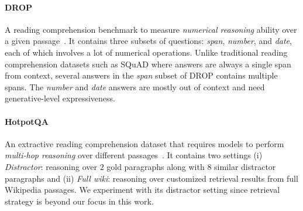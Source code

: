 \paragraph{DROP} A reading comprehension benchmark to measure \textit{numerical reasoning} ability over a given passage~\cite{dua-etal-2019-drop}.
It contains three subsets of questions: \textit{span}, \textit{number}, and \textit{date}, each of which involves a lot of numerical operations. Unlike traditional reading comprehension datasets such as SQuAD \cite{rajpurkar-etal-2016-squad} where answers are always a single span from context, several answers in the \textit{span} subset of DROP contains multiple spans.
The \textit{number} and \textit{date} answers are mostly out of context and need generative-level expressiveness.

\paragraph{HotpotQA} An extractive reading comprehension dataset that requires models to perform \textit{multi-hop reasoning} over different passages~\cite{yang-etal-2018-hotpotqa}.
It contains two settings (i) \textit{Distractor}: reasoning over $2$ gold paragraphs along with $8$ similar distractor paragraphs and (ii) \textit{Full wiki}: reasoning over customized retrieval results from full Wikipedia passages.
We experiment with its distractor setting since retrieval strategy is beyond our focus in this work.

\begin{table}[t]
  \centering
  \small
  \caption{The statistics of our experimental datasets.}
  \label{tab:dataset-data}\end{table}

